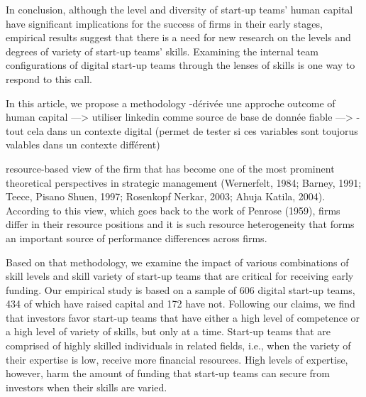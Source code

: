 \documentclass[12pt]{article}
\begin{document}
In conclusion, although the level and diversity of start-up teams' human capital have significant implications for the success of firms in their early stages, empirical results suggest that there is a need for new research on the levels and degrees of variety of start-up teams' skills. Examining the internal team configurations of digital start-up teams through the lenses of skills is one way to respond to this call.

In this article, we propose a methodology
-dérivée une approche outcome of human capital
---> utiliser linkedin comme source de base de donnée fiable
--->
-tout cela dans un contexte digital (permet de tester si ces variables sont toujorus valables dans un contexte différent)


resource-based view of the firm that has become one of the most prominent theoretical perspectives in strategic management (Wernerfelt, 1984; Barney, 1991; Teece, Pisano Shuen, 1997; Rosenkopf Nerkar, 2003; Ahuja Katila, 2004). According to this view, which goes back to the work of Penrose (1959), firms differ in their resource positions and it is such resource heterogeneity that forms an important source of performance differences across firms.


Based on that methodology, we examine the impact of various combinations of skill levels and skill variety of start-up teams that are critical for receiving early funding. Our empirical study is based on a sample of 606 digital start-up teams, 434 of which have raised capital and 172 have not. Following our claims, we find that investors favor start-up teams that have either a high level of competence or a high level of variety of skills, but only at a time. Start-up teams that are comprised of highly skilled individuals in related fields, i.e., when the variety of their expertise is low, receive more financial resources. High levels of expertise, however, harm the amount of funding that start-up teams can secure from investors when their skills are varied.
\end{document}
